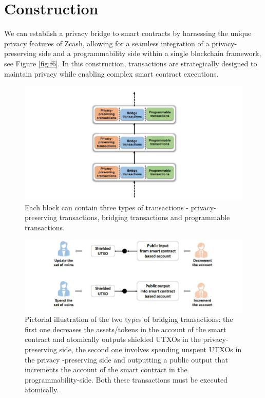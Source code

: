\documentclass{report}
\begin{document}
\section{Construction}
We can establish a privacy bridge to smart contracts by harnessing the unique privacy features of Zcash, allowing for a seamless integration of a privacy-preserving side and a programmability side within a single blockchain framework, see Figure \ref{fig:f6}. In this construction, transactions are strategically designed to maintain privacy while enabling complex smart contract executions.\\
\begin{center}
	\begin{figure}
		\centering
		\includegraphics[width=0.8\linewidth]{Fig/F7}
		\caption{
			Each block can contain three types of transactions - privacy-preserving transactions, bridging transactions and programmable transactions.
		}
		\label{fig:f7}
	\end{figure}
\end{center}
\begin{center}
	\begin{figure}
		\centering
		\includegraphics[width=0.8\linewidth]{Fig/F8}
		\caption{
			Pictorial illustration of the two types of bridging transactions: the first one decreases the assets/tokens in the account of the smart contract and atomically outputs shielded UTXOs in the privacy-preserving side, the second one involves spending unspent UTXOs in the privacy -preserving side and outputting a public output that increments the account of the smart contract in the programmability-side. Both these transactions must be executed atomically.
		}
		\label{fig:f8}
	\end{figure}
\end{center}
\end{document}
